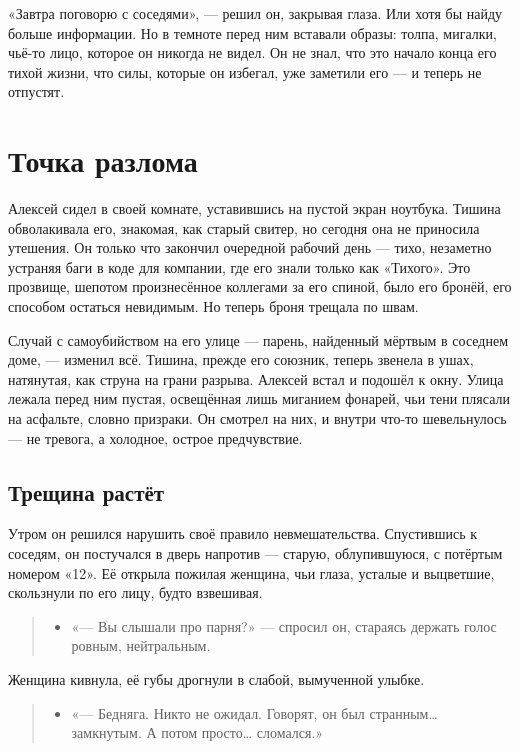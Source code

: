 \documentclass[12pt,a4paper]{book}
\newenvironment{dialogue}{\begin{quote}\itshape\begin{itemize}\item[]}{\end{itemize}\end{quote}}
\begin{document}
«Завтра поговорю с соседями», --- решил он, закрывая глаза. Или хотя бы найду больше информации. Но в темноте перед ним вставали образы: толпа, мигалки, чьё-то лицо, которое он никогда не видел. Он не знал, что это начало конца его тихой жизни, что силы, которые он избегал, уже заметили его --- и теперь не отпустят.

\chapter{Точка разлома}

Алексей сидел в своей комнате, уставившись на пустой экран ноутбука. Тишина обволакивала его, знакомая, как старый свитер, но сегодня она не приносила утешения. Он только что закончил очередной рабочий день --- тихо, незаметно устраняя баги в коде для компании, где его знали только как «Тихого». Это прозвище, шепотом произнесённое коллегами за его спиной, было его бронёй, его способом остаться невидимым. Но теперь броня трещала по швам.

Случай с самоубийством на его улице — парень, найденный мёртвым в соседнем доме, — изменил всё. Тишина, прежде его союзник, теперь звенела в ушах, натянутая, как струна на грани разрыва. Алексей встал и подошёл к окну. Улица лежала перед ним пустая, освещённая лишь миганием фонарей, чьи тени плясали на асфальте, словно призраки. Он смотрел на них, и внутри что-то шевельнулось — не тревога, а холодное, острое предчувствие.

\section{Трещина растёт}

Утром он решился нарушить своё правило невмешательства. Спустившись к соседям, он постучался в дверь напротив — старую, облупившуюся, с потёртым номером «12». Её открыла пожилая женщина, чьи глаза, усталые и выцветшие, скользнули по его лицу, будто взвешивая.

\begin{dialogue}
«— Вы слышали про парня?» — спросил он, стараясь держать голос ровным, нейтральным.
\end{dialogue}

Женщина кивнула, её губы дрогнули в слабой, вымученной улыбке.

\begin{dialogue}
«— Бедняга. Никто не ожидал. Говорят, он был странным… замкнутым. А потом просто… сломался.»
\end{dialogue}
\end{document}
